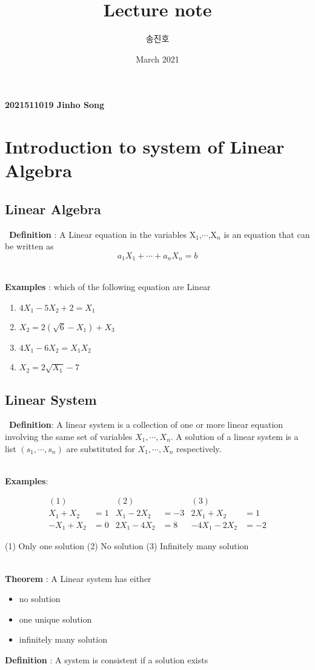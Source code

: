 \documentclass{article}
\title{Lecture note}
\author{송진호 }
\date{March 2021}
\begin{document}
\begin{flushright}
\textbf{2021511019 Jinho Song }
\end{flushright}
\section{Introduction to system of Linear Algebra}

\subsection{Linear Algebra}
{\
\textbf{Definition} : A Linear equation in the variables X$_1$,$\cdots$,X$_n$ is an equation that can be written as
}
\[
    a_1X_1 + \cdots + a_nX_n = b
\]

{\
\\
\textbf{Examples} : which of the following equation are Linear

\begin{enumerate}
\item {$4X_1 - 5X_2 + 2 = X_1$}
\item {$X_2 = 2(\sqrt{6} - X_1 ) + X_3 $}
\item {$4X_1 - 6X_2 = X_1X_2$}
\item {$X_2 = 2\sqrt{X_1}-7$}
\end{enumerate}
}

\subsection*{Linear System}
{\
\textbf{Definition}: A linear system is a collection of one or more linear equation involving the same set of variables $X_1, \cdots , X_n$. A solution of a linear system is a list $(s_1, \cdots , s_n)$ are substituted for $X_1 , \cdots , X_n$ respectively. 
}

{\
\\
\textbf{Examples}:


\begin{align*} 
(1)  &              & (2)        &      & (3)  &\\
X_1 + X_2 &= 1      & X_1 - 2X_2 &= -3  &   2X_1 + X_2 &= 1  \\
-X_1 + X_2 &= 0     & 2X_1 - 4X_2 &= 8  &   -4X_1 - 2X_2 &= -2
\end{align*}
}
(1) Only one solution
(2) No solution
(3) Infinitely many solution


{\
\\
\textbf{Theorem} : A Linear system has either
\begin{itemize}
\item{no solution}
\item{one unique solution}
\item{infinitely many solution }
\end{itemize}

\noindent \textbf{Definition} : A system is consistent if a solution exists
}
\end{document}
